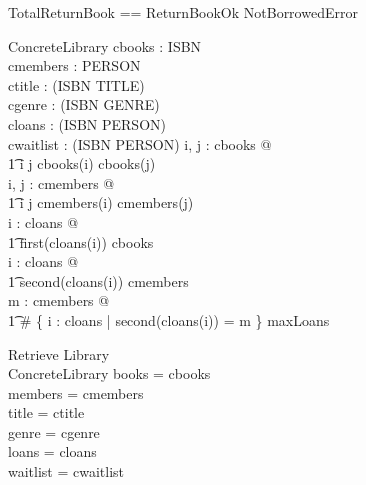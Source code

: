 \documentclass{article}
\begin{document}
\begin{zed}
  TotalReturnBook == ReturnBookOk \lor NotBorrowedError
\end{zed}


\begin{schema}{ConcreteLibrary}
  cbooks : \seq ISBN \\
  cmembers : \seq PERSON \\
  ctitle : \seq (ISBN \cross TITLE) \\
  cgenre : \seq (ISBN \cross GENRE) \\
  cloans : \seq (ISBN \cross PERSON) \\
  cwaitlist : \seq (ISBN \cross \seq PERSON)
\where
  \forall i, j : \dom cbooks @ \\
    \t1 i \neq j \implies cbooks(i) \neq cbooks(j) \\
  \forall i, j : \dom cmembers @ \\
    \t1 i \neq j \implies cmembers(i) \neq cmembers(j) \\
  \forall i : \dom cloans @ \\
    \t1 first(cloans(i)) \in \ran cbooks \\
  \forall i : \dom cloans @ \\
    \t1 second(cloans(i)) \in \ran cmembers \\
  \forall m : \ran cmembers @ \\
    \t1 \# \{ i : \dom cloans | second(cloans(i)) = m \} \leq maxLoans
\end{schema}

\begin{schema}{Retrieve}
  Library \\
  ConcreteLibrary
\where
  books = \ran cbooks \\
  members = \ran cmembers \\
  title = \ran ctitle \\
  genre = \ran cgenre \\
  loans = \ran cloans \\
  waitlist = \ran cwaitlist
\end{schema}
\end{document}
